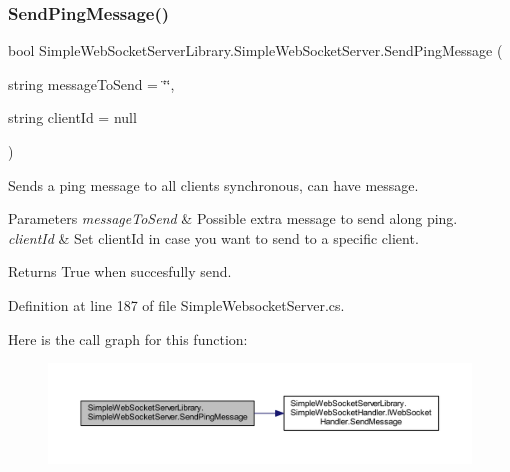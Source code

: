 \subsubsection{\texorpdfstring{Send\+Ping\+Message()}{SendPingMessage()}}
{\footnotesize\ttfamily bool Simple\+Web\+Socket\+Server\+Library.\+Simple\+Web\+Socket\+Server.\+Send\+Ping\+Message (\begin{DoxyParamCaption}\item[{string}]{message\+To\+Send = {\ttfamily \char`\"{}\char`\"{}},  }\item[{string}]{client\+Id = {\ttfamily null} }\end{DoxyParamCaption})}



Sends a ping message to all clients synchronous, can have message. 


\begin{DoxyParams}{Parameters}
{\em message\+To\+Send} & Possible extra message to send along ping.\\
\hline
{\em client\+Id} & Set client\+Id in case you want to send to a specific client.\\
\hline
\end{DoxyParams}
\begin{DoxyReturn}{Returns}
True when succesfully send.
\end{DoxyReturn}


Definition at line 187 of file Simple\+Websocket\+Server.\+cs.

Here is the call graph for this function\+:
\nopagebreak
\begin{figure}[H]
\begin{center}
\leavevmode
\includegraphics[width=350pt]{class_simple_web_socket_server_library_1_1_simple_web_socket_server_ab47f01467513ad98f0d9de69d41e12a5_cgraph}
\end{center}
\end{figure}
\mbox{\label{class_simple_web_socket_server_library_1_1_simple_web_socket_server_a7f0eca90a424040685527ac873c31229}} 

